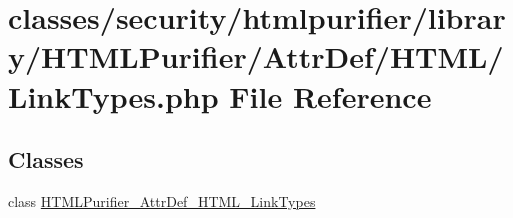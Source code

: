 \hypertarget{LinkTypes_8php}{\section{classes/security/htmlpurifier/library/\+H\+T\+M\+L\+Purifier/\+Attr\+Def/\+H\+T\+M\+L/\+Link\+Types.php File Reference}
\label{LinkTypes_8php}
}
\subsection*{Classes}
\begin{DoxyCompactItemize}
\item 
class \hyperlink{classHTMLPurifier__AttrDef__HTML__LinkTypes}{H\+T\+M\+L\+Purifier\+\_\+\+Attr\+Def\+\_\+\+H\+T\+M\+L\+\_\+\+Link\+Types}
\end{DoxyCompactItemize}
